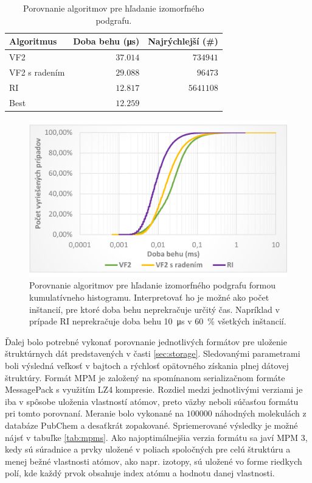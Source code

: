\documentclass[slovak]{ExcelAtFIT} %
\begin{document}
\begin{table}[h]
	\vskip6pt
	\caption{Porovnanie algoritmov pre hľadanie izomorfného podgrafu.}
	\centering
	\begin{tabular}{l|r|r}
		\toprule
		Algoritmus & Doba behu (\si{\micro \second}) & Najrýchlejší (\#)\\
		\midrule
		VF2 & $37.014$ & $734941$ \\
		VF2 s radením & $29.088$ & $96473$ \\
		RI & $12.817$ & $5641108$ \\
		Best & $12.259$ & \\
		\bottomrule
	\end{tabular}
	\label{tab:algo_meas}
\end{table}

\begin{figure}[!htb]
	\centering
	\includegraphics[width=1\linewidth]{images/algo_graph.pdf}
	\caption{Porovnanie algoritmov pre hľadanie i\-zo\-morf\-né\-ho podgrafu formou kumulatívneho hi\-sto\-gra\-mu. Interpretovať ho je možné ako počet inštancií, pre ktoré doba behu neprekračuje určitý čas. Napríklad v prípade RI neprekračuje doba behu \SI{10}{\micro \second} v \SI{60}{\percent} všetkých inštancií. }
	\label{fig:algo_graph}
\end{figure}

Ďalej bolo potrebné vykonať porovnanie jednotlivých formátov pre uloženie štruktúrnych dát predstavených v časti \ref{sec:storage}. Sledovanými parametrami boli výsledná veľkosť v bajtoch a rýchlosť opätovného získania plnej dátovej štruktúry. Formát MPM je založený na spomínanom serializačnom formáte MessagePack s využitím LZ4 kompresie. Rozdiel medzi jednotlivými verziami je iba v spôsobe uloženia vlastností atómov, preto väzby neboli súčasťou formátu pri tomto porovnaní. Meranie bolo vykonané na $100000$ náhodných molekulách z databáze PubChem a desaťkrát zopakované. Spriemerované vý\-sledky je možné nájsť v tabuľke \ref{tab:mpms}. Ako najoptimálnejšia verzia formátu sa javí MPM 3, kedy sú súradnice a prvky uložené v poliach spoločných pre celú štruktúru a menej bežné vlastnosti atómov, ako napr. izotopy, sú uložené vo forme riedkych polí, kde každý prvok obsahuje index atómu a hodnotu danej vlastnosti.
\end{document}
